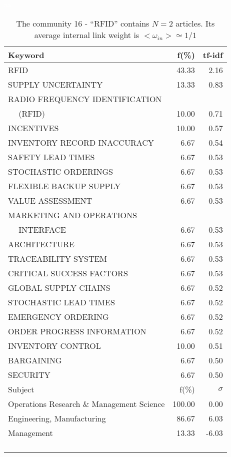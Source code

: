 \documentclass[a4paper,11pt]{report}
\begin{document}
\begin{landscape}
\clearpage

\begin{table}[!ht]
\caption{The community 16 - ``RFID'' contains $N = 2$ articles. Its average internal link weight is $<\omega_{in}> \simeq 1/1$ }
\textcolor{white}{aa}\\
{\scriptsize\begin{tabular}{|l r  r|}
\hline
Keyword & f(\%) & tf-idf \\
\hline
RFID & 43.33 & 2.16\\
SUPPLY UNCERTAINTY & 13.33 & 0.83\\
RADIO FREQUENCY IDENTIFICATION &  &\\
$\quad$ (RFID) & 10.00 & 0.71\\
INCENTIVES & 10.00 & 0.57\\
INVENTORY RECORD INACCURACY & 6.67 & 0.54\\
SAFETY LEAD TIMES & 6.67 & 0.53\\
STOCHASTIC ORDERINGS & 6.67 & 0.53\\
FLEXIBLE BACKUP SUPPLY & 6.67 & 0.53\\
VALUE ASSESSMENT & 6.67 & 0.53\\
MARKETING AND OPERATIONS &  &\\
$\quad$ INTERFACE & 6.67 & 0.53\\
ARCHITECTURE & 6.67 & 0.53\\
TRACEABILITY SYSTEM & 6.67 & 0.53\\
CRITICAL SUCCESS FACTORS & 6.67 & 0.53\\
GLOBAL SUPPLY CHAINS & 6.67 & 0.52\\
STOCHASTIC LEAD TIMES & 6.67 & 0.52\\
EMERGENCY ORDERING & 6.67 & 0.52\\
ORDER PROGRESS INFORMATION & 6.67 & 0.52\\
INVENTORY CONTROL & 10.00 & 0.51\\
BARGAINING & 6.67 & 0.50\\
SECURITY & 6.67 & 0.50\\
\hline
\hline
Subject & f(\%) & $\sigma$\\
\hline
Operations Research \& Management Science & 100.00 & 0.00\\
Engineering, Manufacturing & 86.67 & 6.03\\
Management & 13.33 & -6.03\\
 &  & \\
 &  & \\
 &  & \\
 &  & \\

\end{tabular}}
\end{table}
\end{landscape}
\end{document}
